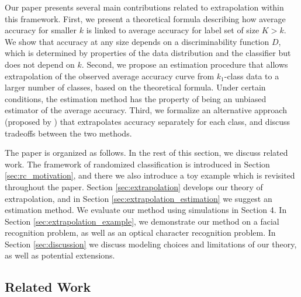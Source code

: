 \documentclass[twoside,11pt]{article}
\begin{document}
Our paper presents several main contributions related to extrapolation within this framework. First, we present a theoretical formula describing how average accuracy for smaller $k$ is linked to average accuracy for label set of size $K > k$. We show that accuracy at any size depends on a discriminability function $D$, which is determined by properties of the data distribution and the classifier but does not depend on $k$. Second, we propose an estimation procedure that allows extrapolation of the observed average accuracy curve from $k_1$-class data to a larger number of classes, based on the theoretical formula. Under certain conditions, the estimation method has the property of being an unbiased estimator of the average accuracy. Third, we formalize an alternative approach (proposed by \cite{Kay2008a}) that extrapolates accuracy separately for each class, and discuss tradeoffs between the two methods.

The paper is organized as follows.  In the rest of this section, we
discuss related work.  The framework of randomized classification is
introduced in Section \ref{sec:rc_motivation}, and there we also
introduce a toy example which is revisited throughout the
paper. Section \ref{sec:extrapolation} develops our theory of
extrapolation, and in Section \ref{sec:extrapolation_estimation} we
suggest an estimation method. We evaluate our method using simulations in Section 4.
In Section
\ref{sec:extrapolation_example}, we demonstrate our method on a facial
recognition problem, as well as an optical character recognition problem. In Section \ref{sec:discussion} we
discuss modeling choices and limitations of our theory, as well as
potential extensions.

\subsection{Related Work}

\end{document}
